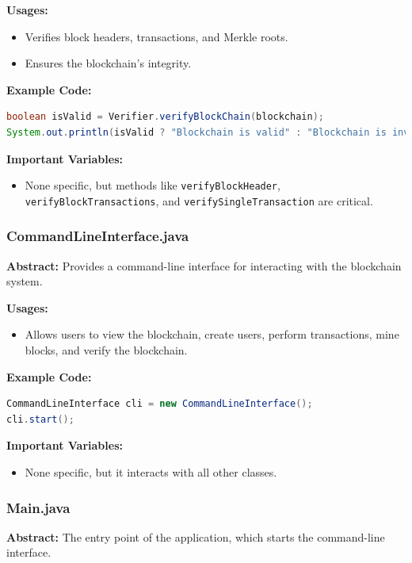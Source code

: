 \documentclass[12pt]{article}
\begin{document}
\textbf{Usages:}
\begin{itemize}
    \item Verifies block headers, transactions, and Merkle roots.
    \item Ensures the blockchain's integrity.
\end{itemize}

\textbf{Example Code:}
\begin{lstlisting}[language=Java]
boolean isValid = Verifier.verifyBlockChain(blockchain);
System.out.println(isValid ? "Blockchain is valid" : "Blockchain is invalid");
\end{lstlisting}

\textbf{Important Variables:}
\begin{itemize}
    \item None specific, but methods like \texttt{verifyBlockHeader}, \texttt{verifyBlockTransactions}, and \texttt{verifySingleTransaction} are critical.
\end{itemize}

\subsubsection{CommandLineInterface.java}
\textbf{Abstract:} Provides a command-line interface for interacting with the blockchain system.

\textbf{Usages:}
\begin{itemize}
    \item Allows users to view the blockchain, create users, perform transactions, mine blocks, and verify the blockchain.
\end{itemize}

\textbf{Example Code:}
\begin{lstlisting}[language=Java]
CommandLineInterface cli = new CommandLineInterface();
cli.start();
\end{lstlisting}

\textbf{Important Variables:}
\begin{itemize}
    \item None specific, but it interacts with all other classes.
\end{itemize}

\subsubsection{Main.java}
\textbf{Abstract:} The entry point of the application, which starts the command-line interface.
\end{document}
